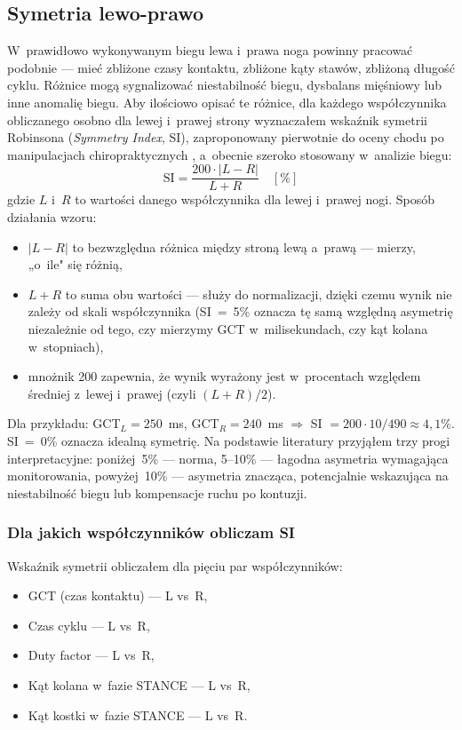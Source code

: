\subsection{Symetria lewo-prawo}
\label{sec:symmetry}

W~prawidłowo wykonywanym biegu lewa i~prawa noga powinny pracować podobnie --- mieć zbliżone czasy kontaktu, zbliżone kąty stawów, zbliżoną długość cyklu. Różnice mogą sygnalizować niestabilność biegu, dysbalans mięśniowy lub inne anomalię biegu. Aby ilościowo opisać te różnice, dla każdego współczynnika obliczanego osobno dla lewej i~prawej strony wyznaczałem wskaźnik symetrii Robinsona (\textit{Symmetry Index}, SI), zaproponowany pierwotnie do oceny chodu po manipulacjach chiropraktycznych \cite{robinson1987}, a~obecnie szeroko stosowany w~analizie biegu:
\[
\text{SI} = \frac{200 \cdot |L - R|}{L + R} \quad [\%]
\]
gdzie $L$ i~$R$ to wartości danego współczynnika dla lewej i~prawej nogi. Sposób działania wzoru:

\begin{itemize}
    \item $|L - R|$ to bezwzględna różnica między stroną lewą a~prawą --- mierzy, „o~ile" się różnią,
    \item $L + R$ to suma obu wartości --- służy do normalizacji, dzięki czemu wynik nie zależy od skali współczynnika (SI~=~5\% oznacza tę samą względną asymetrię niezależnie od tego, czy mierzymy GCT w~milisekundach, czy kąt kolana w~stopniach),
    \item mnożnik 200 zapewnia, że wynik wyrażony jest w~procentach względem średniej z~lewej i~prawej (czyli $(L+R)/2$).
\end{itemize}

Dla przykładu: GCT$_L = 250$~ms, GCT$_R = 240$~ms $\Rightarrow$ SI $= 200 \cdot 10 / 490 \approx 4{,}1\%$. SI~=~0\% oznacza idealną symetrię. Na podstawie literatury przyjąłem trzy progi interpretacyjne: poniżej~5\% --- norma, 5--10\% --- łagodna asymetria wymagająca monitorowania, powyżej~10\% --- asymetria znacząca, potencjalnie wskazująca na niestabilność biegu lub kompensacje ruchu po kontuzji.

\subsubsection{Dla jakich współczynników obliczam SI}

Wskaźnik symetrii obliczałem dla pięciu par współczynników:
\begin{itemize}
    \item GCT (czas kontaktu) --- L vs~R,
    \item Czas cyklu --- L vs~R,
    \item Duty factor --- L vs~R,
    \item Kąt kolana w~fazie STANCE --- L vs~R,
    \item Kąt kostki w~fazie STANCE --- L vs~R.
\end{itemize}

